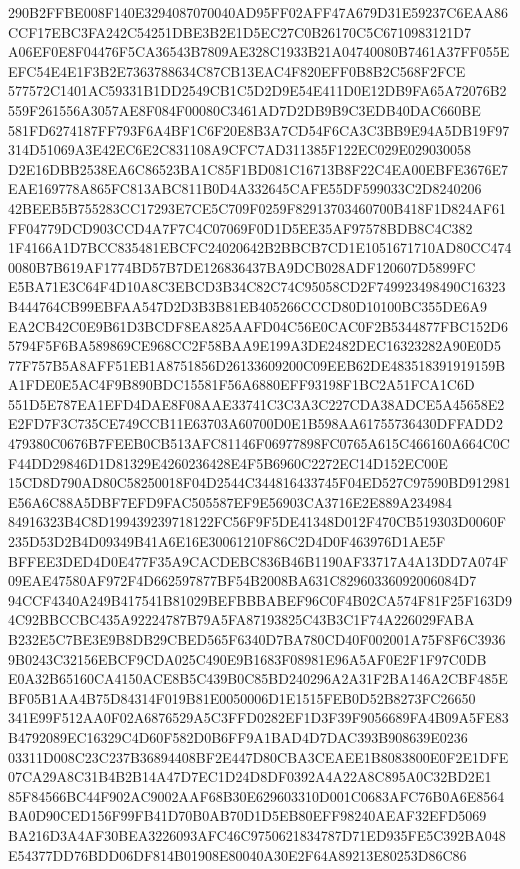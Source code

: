 \documentclass[UTF8,fontset=fandol,zihao=-4,a4paper]{ctexart}
\begin{document}
{{290B2FFBE008F140E3294087070040AD95FF02AFF47A679D31E59237C6EAA86CCF17EBC3FA242C54251DBE3B2E1D5EC27C0B26170C5C6710983121D7
A06EF0E8F04476F5CA36543B7809AE328C1933B21A04740080B7461A37FF055EEFC54E4E1F3B2E7363788634C87CB13EAC4F820EFF0B8B2C568F2FCE
577572C1401AC59331B1DD2549CB1C5D2D9E54E411D0E12DB9FA65A72076B2559F261556A3057AE8F084F00080C3461AD7D2DB9B9C3EDB40DAC660BE
581FD6274187FF793F6A4BF1C6F20E8B3A7CD54F6CA3C3BB9E94A5DB19F97314D51069A3E42EC6E2C831108A9CFC7AD311385F122EC029E029030058
D2E16DBB2538EA6C86523BA1C85F1BD081C16713B8F22C4EA00EBFE3676E7EAE169778A865FC813ABC811B0D4A332645CAFE55DF599033C2D8240206
42BEEB5B755283CC17293E7CE5C709F0259F82913703460700B418F1D824AF61FF04779DCD903CCD4A7F7C4C07069F0D1D5EE35AF97578BDB8C4C382
1F4166A1D7BCC835481EBCFC24020642B2BBCB7CD1E1051671710AD80CC4740080B7B619AF1774BD57B7DE126836437BA9DCB028ADF120607D5899FC
E5BA71E3C64F4D10A8C3EBCD3B34C82C74C95058CD2F749923498490C16323B444764CB99EBFAA547D2D3B3B81EB405266CCCD80D10100BC355DE6A9
EA2CB42C0E9B61D3BCDF8EA825AAFD04C56E0CAC0F2B5344877FBC152D65794F5F6BA589869CE968CC2F58BAA9E199A3DE2482DEC16323282A90E0D5
77F757B5A8AFF51EB1A8751856D26133609200C09EEB62DE483518391919159BA1FDE0E5AC4F9B890BDC15581F56A6880EFF93198F1BC2A51FCA1C6D
551D5E787EA1EFD4DAE8F08AAE33741C3C3A3C227CDA38ADCE5A45658E2E2FD7F3C735CE749CCB11E63703A60700D0E1B598AA61755736430DFFADD2
479380C0676B7FEEB0CB513AFC81146F06977898FC0765A615C466160A664C0CF44DD29846D1D81329E4260236428E4F5B6960C2272EC14D152EC00E
15CD8D790AD80C58250018F04D2544C344816433745F04ED527C97590BD912981E56A6C88A5DBF7EFD9FAC505587EF9E56903CA3716E2E889A234984
84916323B4C8D199439239718122FC56F9F5DE41348D012F470CB519303D0060F235D53D2B4D09349B41A6E16E30061210F86C2D4D0F463976D1AE5F
BFFEE3DED4D0E477F35A9CACDEBC836B46B1190AF33717A4A13DD7A074F09EAE47580AF972F4D662597877BF54B2008BA631C82960336092006084D7
94CCF4340A249B417541B81029BEFBBBABEF96C0F4B02CA574F81F25F163D94C92BBCCBC435A92224787B79A5FA87193825C43B3C1F74A226029FABA
B232E5C7BE3E9B8DB29CBED565F6340D7BA780CD40F002001A75F8F6C39369B0243C32156EBCF9CDA025C490E9B1683F08981E96A5AF0E2F1F97C0DB
E0A32B65160CA4150ACE8B5C439B0C85BD240296A2A31F2BA146A2CBF485EBF05B1AA4B75D84314F019B81E0050006D1E1515FEB0D52B8273FC26650
341E99F512AA0F02A6876529A5C3FFD0282EF1D3F39F9056689FA4B09A5FE83B4792089EC16329C4D60F582D0B6FF9A1BAD4D7DAC393B908639E0236
03311D008C23C237B36894408BF2E447D80CBA3CEAEE1B8083800E0F2E1DFE07CA29A8C31B4B2B14A47D7EC1D24D8DF0392A4A22A8C895A0C32BD2E1
85F84566BC44F902AC9002AAF68B30E629603310D001C0683AFC76B0A6E8564BA0D90CED156F99FB41D70B0AB70D1D5EB80EFF98240AEAF32EFD5069
BA216D3A4AF30BEA3226093AFC46C9750621834787D71ED935FE5C392BA048E54377DD76BDD06DF814B01908E80040A30E2F64A89213E80253D86C86
}}
\end{document}
